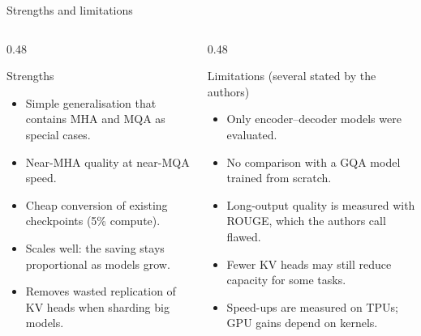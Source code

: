 \documentclass[aspectratio=169,11pt]{beamer}
\begin{document}
\begin{frame}{Strengths and limitations}
  \begin{columns}[T]
    \begin{column}{0.48\textwidth}
      \begin{exampleblock}{Strengths}
        \small
        \begin{itemize}
          \item Simple generalisation that contains MHA and MQA as special cases.
          \item Near-MHA quality at near-MQA speed.
          \item Cheap conversion of existing checkpoints (5\% compute).
          \item Scales well: the saving stays proportional as models grow.
          \item Removes wasted replication of KV heads when sharding big models.
        \end{itemize}
      \end{exampleblock}
    \end{column}
    \begin{column}{0.48\textwidth}
      \begin{alertblock}{Limitations (several stated by the authors)}
        \small
        \begin{itemize}
          \item Only encoder--decoder models were evaluated.
          \item No comparison with a GQA model trained from scratch.
          \item Long-output quality is measured with ROUGE, which the authors call flawed.
          \item Fewer KV heads may still reduce capacity for some tasks.
          \item Speed-ups are measured on TPUs; GPU gains depend on kernels.
        \end{itemize}
      \end{alertblock}
    \end{column}
  \end{columns}
\end{frame}
\end{document}
